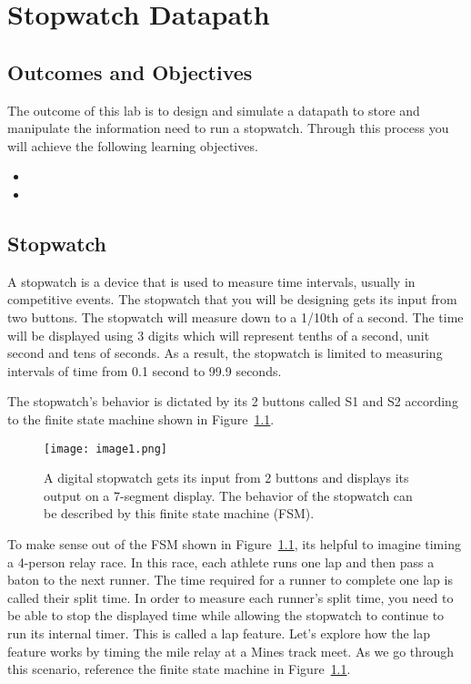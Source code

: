 \chapter{Stopwatch Datapath}
\label{chapter:stopDatapath}
\graphicspath{ {./Lab09Datapath/Fig} }



\section{Outcomes and Objectives}

The outcome of this lab is to design and simulate 
a datapath to store and manipulate the information need to run a stopwatch.
Through this process you will achieve the following
learning objectives.
\begin{itemize}
	\item {}
	\item {}
\end{itemize}



\section{Stopwatch}

A stopwatch is a device that is used to measure time intervals, usually
in competitive events. The stopwatch that you will be designing gets its
input from two buttons. The stopwatch will measure down to a 1/10th of a
second. The time will be displayed using 3 digits which will represent
tenths of a second, unit second and tens of seconds. As a result, the
stopwatch is limited to measuring intervals of time from 0.1 second to
99.9 seconds.

The stopwatch's behavior is dictated by its 2 buttons called S1 and S2
according to the finite state machine shown in Figure~\ref{fig:swDPbehavior}.

\begin{figure}[ht]
\texttt{[image: image1.png]}
\caption{A digital stopwatch gets its input from 2 buttons and displays
its output on a 7-segment display. The behavior of the stopwatch can be
described by this finite state machine (FSM).}
\label{fig:swDPbehavior}
\end{figure}

To make sense out of the FSM shown in Figure~\ref{fig:swDPbehavior}, its helpful to imagine
timing a 4-person relay race. In this race, each athlete runs one lap
and then pass a baton to the next runner. The time required for a runner
to complete one lap is called their split time. In order to measure each
runner's split time, you need to be able to stop the displayed time
while allowing the stopwatch to continue to run its internal timer. This
is called a lap feature. Let's explore how the lap feature works by
timing the mile relay at a Mines track meet. As we go through this
scenario, reference the finite state machine in Figure~\ref{fig:swDPbehavior}.

